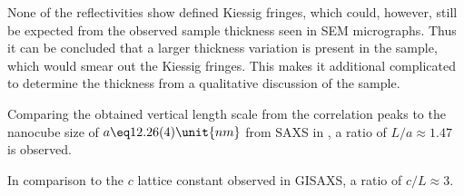 \documentclass[\main/dresen_thesis.tex]{subfiles}
\begin{document}
  None of the reflectivities show defined Kiessig fringes, which could, however, still be expected from the observed sample thickness seen in SEM micrographs.
  Thus it can be concluded that a larger thickness variation is present in the sample, which would smear out the Kiessig fringes.
  This makes it additional complicated to determine the thickness from a qualitative discussion of the sample.

  Comparing the obtained vertical length scale from the correlation peaks to the nanocube size of $a \eq 12.26(4) \unit{nm}$ from SAXS in , a ratio of $L/a \approx 1.47$ is observed.
  
  In comparison to the $c$ lattice constant observed in GISAXS, a ratio of  $c / L \approx 3$.
\end{document}
